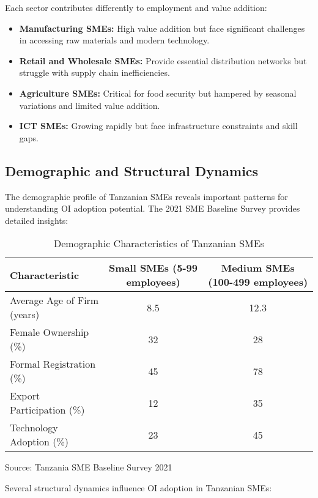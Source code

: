 Each sector contributes differently to employment and value addition:
\begin{itemize}
    \item \textbf{Manufacturing SMEs:} High value addition but face significant challenges in accessing raw materials and modern technology.
    \item \textbf{Retail and Wholesale SMEs:} Provide essential distribution networks but struggle with supply chain inefficiencies.
    \item \textbf{Agriculture SMEs:} Critical for food security but hampered by seasonal variations and limited value addition.
    \item \textbf{ICT SMEs:} Growing rapidly but face infrastructure constraints and skill gaps.
\end{itemize}

\subsection{Demographic and Structural Dynamics}

The demographic profile of Tanzanian SMEs reveals important patterns for understanding OI adoption potential. The 2021 SME Baseline Survey provides detailed insights:

\begin{table}[H]
\centering
\caption{Demographic Characteristics of Tanzanian SMEs}
\label{tab:sme_demographics}
\begin{tabular}{@{}lcc@{}}
\toprule
\textbf{Characteristic} & \textbf{Small SMEs (5-99 employees)} & \textbf{Medium SMEs (100-499 employees)} \\
\midrule
Average Age of Firm (years) & 8.5 & 12.3 \\
Female Ownership (\%) & 32 & 28 \\
Formal Registration (\%) & 45 & 78 \\
Export Participation (\%) & 12 & 35 \\
Technology Adoption (\%) & 23 & 45 \\
\bottomrule
\end{tabular}
\begin{tablenotes}
\item Source: Tanzania SME Baseline Survey 2021 \citep{tanzania2021sme}
\end{tablenotes}
\end{table}

Several structural dynamics influence OI adoption in Tanzanian SMEs:

